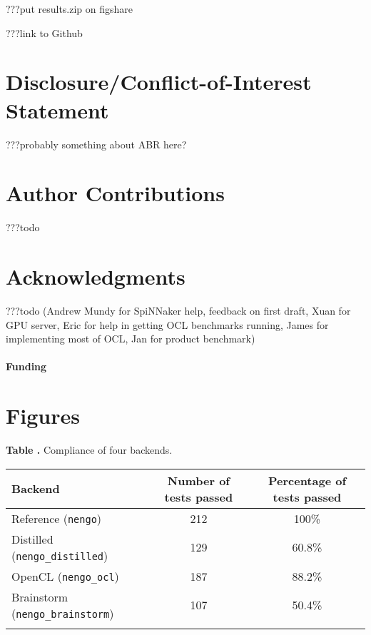 \documentclass{frontiersSCNS}
\begin{document}
???put results.zip on figshare

???link to Github

\section*{Disclosure/Conflict-of-Interest Statement}

???probably something about ABR here?

\section*{Author Contributions}

???todo

\section*{Acknowledgments}

???todo
(Andrew Mundy for SpiNNaker help, feedback on first draft,
Xuan for GPU server, Eric for help in getting OCL benchmarks running,
James for implementing most of OCL, Jan for product benchmark)

\paragraph{Funding\textcolon} %




\section*{Figures}

\begin{table}[!ht]
\textbf{\label{Tab:01} Table .}{
  Compliance of four backends.}

\processtable{ }
{\begin{tabular}{lcc}\toprule
 Backend & Number of tests passed & Percentage of tests passed\\\midrule
 Reference (\texttt{nengo}) & 212 & 100\% \\
 Distilled (\texttt{nengo\_distilled}) & 129 & 60.8\% \\
 OpenCL (\texttt{nengo\_ocl}) & 187 & 88.2\% \\
 Brainstorm (\texttt{nengo\_brainstorm}) & 107 & 50.4\% \\\botrule
\end{tabular}}{}
\end{table}
\end{document}
